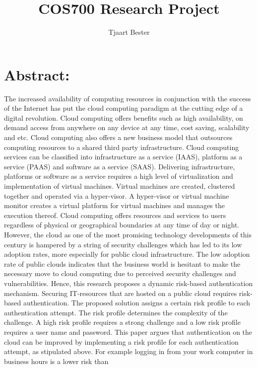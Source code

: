 \documentclass[11pt]{article}
\author{Tjaart Bester}
\begin{document}
\title{COS700 Research Project}
\maketitle


\section{Abstract:}
The increased availability of computing resources in conjunction with the success of the Internet has put the cloud computing
paradigm at the cutting edge of a digital revolution. Cloud computing offers benefits such as high availability, on demand access from
anywhere on any device at any time, cost saving, scalability and etc. Cloud computing also offers a new business model that outsources
computing resources to a shared third party infrastructure. Cloud computing services can be classified into infrastructure as a service
(IAAS), platform as a service (PAAS) and software as a service (SAAS). Delivering infrastructure, platforms or software as a service
requires a high level of virtualization and implementation of virtual machines. Virtual machines are created, clustered together and
operated via a hyper-visor. A hyper-visor or virtual machine monitor creates a virtual platform for virtual machines and manages the
execution thereof. Cloud computing offers resources and services to users regardless of physical or geographical boundaries at any
time of day or night. However, the cloud as one of the most promising technology developments of this century is hampered by a string
of security challenges which has led to its low adoption rates, more especially for public cloud infrastructure. The low adoption rate
of public clouds indicates that the business world is hesitant to make the necessary move to cloud computing due to perceived security
challenges and vulnerabilities.
Hence, this research proposes a dynamic risk-based authentication mechanism. Securing IT-resources that are hosted on a public cloud
requires risk-based authentication. The proposed solution assigns a certain risk profile to each authentication attempt. The risk
profile determines the complexity of the challenge. A high risk profile requires a strong challenge and a low risk profile requires a
user name and password. This paper argues that authentication on the cloud can be improved by implementing a risk profile for each
authentication attempt, as stipulated above. For example logging in from your work computer in business hours is a lower risk than
\end{document}

